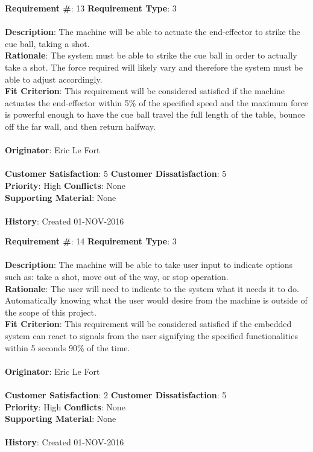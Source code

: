 \documentclass[titlepage]{article}
\begin{document}
\begin{framed}
	\noindent\textbf{Requirement \#}: 13 \hfill \textbf{Requirement Type}: 3 \hfill\\\\
	\noindent\textbf{Description}: The machine will be able to actuate the end-effector to strike the cue ball, taking a shot.\\
	\textbf{Rationale}: The system must be able to strike the cue ball in order to actually take a shot. The force required will likely vary and therefore the system must be able to adjust accordingly.\\
	\textbf{Fit Criterion}: This requirement will be considered satisfied if the machine actuates the end-effector within 5\% of the specified speed and the maximum force is powerful enough to have the cue ball travel the full length of the table, bounce off the far wall, and then return halfway.\\\\
	\textbf{Originator}: Eric Le Fort\\\\
	\noindent\textbf{Customer Satisfaction}: 5 \hfill 	\textbf{Customer Dissatisfaction}: 5 \hfill\\
	\textbf{Priority}: High \hfill \textbf{Conflicts}: None \hfill\\
	\textbf{Supporting Material}: None\\\\
	\noindent\textbf{History}: Created 01-NOV-2016
\end{framed}

\begin{framed}
	\noindent\textbf{Requirement \#}: 14 \hfill \textbf{Requirement Type}: 3 \hfill\\\\
	\noindent\textbf{Description}: The machine will be able to take user input to indicate options such as: take a shot, move out of the way, or stop operation.\\
	\textbf{Rationale}: The user will need to indicate to the system what it needs it to do. Automatically knowing what the user would desire from the machine is outside of the scope of this project.\\
	\textbf{Fit Criterion}: This requirement will be considered satisfied if the embedded system can react to signals from the user signifying the specified functionalities within 5 seconds 90\% of the time.\\\\
	\textbf{Originator}: Eric Le Fort\\\\
	\noindent\textbf{Customer Satisfaction}: 2 \hfill 	\textbf{Customer Dissatisfaction}: 5 \hfill\\
	\textbf{Priority}: High \hfill \textbf{Conflicts}: None \hfill\\
	\textbf{Supporting Material}: None\\\\
	\noindent\textbf{History}: Created 01-NOV-2016
\end{framed}
\end{document}
